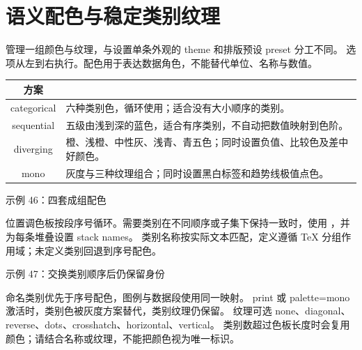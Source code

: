 \section{语义配色与稳定类别纹理}
 管理一组颜色与纹理，与设置单条外观的 theme 和排版预设 preset 分工不同。
选项从左到右执行。配色用于表达数据角色，不能替代单位、名称与数值。

\begin{center}
\begin{tabularx}{\linewidth}{@{}c>{\centering\arraybackslash}X@{}}
\toprule
\multicolumn{1}{c}{方案} & \multicolumn{1}{c}{用途}\\\midrule
categorical & 六种类别色，循环使用；适合没有大小顺序的类别。\\
sequential & 五级由浅到深的蓝色，适合有序类别，不自动把数值映射到色阶。\\
diverging & 橙、浅橙、中性灰、浅青、青五色；同时设置负值、比较色及差中好颜色。\\
mono & 灰度与三种纹理组合；同时设置黑白标签和趋势线极值点色。\\
\bottomrule
\end{tabularx}
\end{center}
\begin{example}[text and listing,sidebyside=false]{示例 46：四套成组配色}



\end{example}
位置调色板按段序号循环。需要类别在不同顺序或子集下保持一致时，使用
，并为每条堆叠设置 stack names。
类别名称按实际文本匹配，定义遵循 TeX 分组作用域；未定义类别回退到序号配色。
\begin{example}[text and listing,sidebyside=false]{示例 47：交换类别顺序后仍保留身份}


\end{example}
命名类别优先于序号配色，图例与数据段使用同一映射。
print 或 palette=mono 激活时，类别色被灰度方案替代，类别纹理仍保留。
纹理可选 none、diagonal、reverse、dots、crosshatch、horizontal、vertical。
类别数超过色板长度时会复用颜色；请结合名称或纹理，不能把颜色视为唯一标识。
